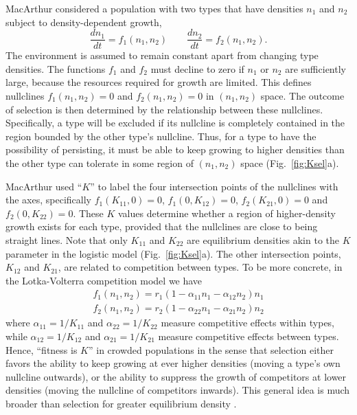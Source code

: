 \documentclass[12pt]{article}
\begin{document}
MacArthur considered a population with two types that have densities $n_1$ and $n_2$ subject to density-dependent growth,
\begin{equation}
\frac{d n_1}{d t}=f_1(n_1,n_2)\qquad\frac{d n_2}{d t}=f_2(n_1,n_2). \label{eq:macgeneral}
\end{equation}
The environment is assumed to remain constant apart from changing type densities. The functions $f_1$ and $f_2$ must decline to zero if $n_1$ or $n_2$ are sufficiently large, because the resources required for growth are limited. This defines nullclines $f_1(n_1,n_2)=0$ and $f_2(n_1,n_2)=0$ in $(n_1,n_2)$ space. The outcome of selection is then determined by the relationship between these nullclines. Specifically, a type will be excluded if its nullcline is completely contained in the region bounded by the other type's nullcline. Thus, for a type to have the possibility of persisting, it must be able to keep growing to higher densities than the other type can tolerate in some region of $(n_1,n_2)$ space (Fig.~\ref{fig:Ksel}a).

MacArthur used ``$K$'' to label the four intersection points of the nullclines with the axes, specifically $f_1(K_{11},0)=0$, $f_1(0,K_{12})=0$, $f_2(K_{21},0)=0$ and $f_2(0,K_{22})=0$. These $K$ values determine whether a region of higher-density growth exists for each type, provided that the nullclines are close to being straight lines. Note that only $K_{11}$ and $K_{22}$ are equilibrium densities akin to the $K$ parameter in the logistic model (Fig.~\ref{fig:Ksel}a). The other intersection points, $K_{12}$ and $K_{21}$, are related to competition between types. To be more concrete, in the Lotka-Volterra competition model we have
\begin{align}
f_1(n_1,n_2) = r_1(1-\alpha_{11}n_1-\alpha_{12}n_2)n_1\nonumber\\
f_2(n_1,n_2) = r_2(1-\alpha_{22}n_1-\alpha_{21}n_2)n_2\label{eq:LV}
\end{align}
where $\alpha_{11}=1/K_{11}$ and $\alpha_{22}=1/K_{22}$ measure competitive effects within types, while $\alpha_{12}=1/K_{12}$ and $\alpha_{21}=1/K_{21}$ measure competitive effects between types. Hence, ``fitness is $K$'' in crowded populations \citep[pp. 149]{macarthur_1967} in the sense that selection either favors the ability to keep growing at ever higher densities (moving a type's own nullcline outwards), or the ability to suppress the growth of competitors at lower densities (moving the nullcline of competitors inwards). This general idea is much broader than selection for greater equilibrium density \citep{gill_1974}.
\end{document}
